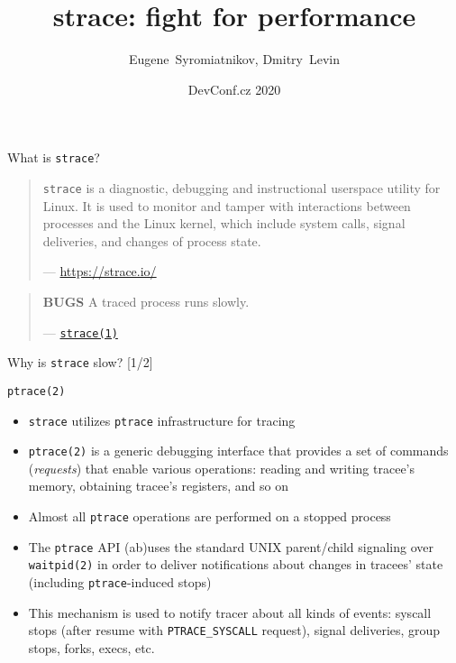 \documentclass[unicode,aspectratio=169]{beamer}
\title{\Huge strace: fight for performance}
\author{Eugene~Syromiatnikov, Dmitry~Levin}
\date{DevConf.cz 2020}
\begin{document}
\begin{frame}
\titlepage
\end{frame}

\begin{frame}{What is \texttt{strace}?}
\begin{quote}
\texttt{strace} is a diagnostic, debugging and instructional userspace
utility for Linux.
It is used to monitor and tamper with interactions between processes
and the Linux kernel, which include system calls, signal deliveries,
and changes of process state.

\begin{flushright}
— \url{https://strace.io/}
\end{flushright}
\end{quote}
\pause
\begin{quote}
\textbf{BUGS}
\linebreak
A traced process runs slowly.
\begin{flushright}
— \href{http://man7.org/linux/man-pages/man1/strace.1.html\#BUGS}{\texttt{strace(1)}}
\end{flushright}
\end{quote}
\end{frame}

\begin{frame}{Why is \texttt{strace} slow? \hfill [1/2]}
\pause
\begin{block}{\large \texttt{ptrace(2)}}
\begin{itemize}
  \item \texttt{strace} utilizes \texttt{ptrace} infrastructure for tracing
  \item \texttt{ptrace(2)} is a generic debugging interface that provides
        a set of commands (\emph{requests}) that enable various operations:
	reading and writing tracee's memory, obtaining tracee's registers,
	and so on
  \item Almost all \texttt{ptrace} operations are performed on a stopped process
  \item The \texttt{ptrace} API (ab)uses the standard UNIX parent/child
        signaling over \texttt{waitpid(2)} in order to deliver notifications
	about changes in tracees' state (including \texttt{ptrace}-induced
	stops)
  \item This mechanism is used to notify tracer about all kinds of events:
        syscall stops (after resume with \texttt{PTRACE\_SYSCALL} request),
	signal deliveries, group stops, forks, execs, etc.
\end{itemize}
\end{block}
\end{frame}
\end{document}
